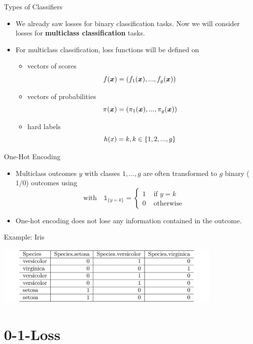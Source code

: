 \begin{vbframe}{Types of Classifiers}
\begin{itemize}
  \item We already saw losses for binary classification tasks. 
  Now we will consider losses for \textbf{multiclass classification} tasks.
  \lz
  \item For multiclass classification, loss functions will be defined on
  \begin{itemize}
    \item vectors of scores $$f(\bm{x}) = \left(f_1(\bm{x}), ..., f_g(\bm{x})\right)$$
    \item vectors of probabilities $$\pi(\bm{x}) = \left(\pi_1(\bm{x}), ..., \pi_g(\bm{x})\right)$$
    \item hard labels $$h(x) = k, k \in \{1, 2, ..., g\}$$
\end{itemize}
\end{itemize}
\end{vbframe}

\begin{vbframe}{One-Hot Encoding}
\begin{itemize}
\item Multiclass outcomes $y$ with classes $1,\dots, g$ are often transformed to $g$ binary ($1$/$0$) outcomes 
using 
$$
\text{with}\quad \mathds{1}_{\{y = k\}} = \begin{cases} 1 & \text{ if } y = k \\
0 & \text{ otherwise}\end{cases}
$$
\item One-hot encoding does not lose any information contained in the outcome. 
\end{itemize}
\vspace{0.2cm}
Example: Iris

\vspace*{0.1cm}
\begin{center}
\includegraphics[width = 11cm ]{figure/iris_encoding.png}
\end{center}

\end{vbframe}

\section{0-1-Loss}

